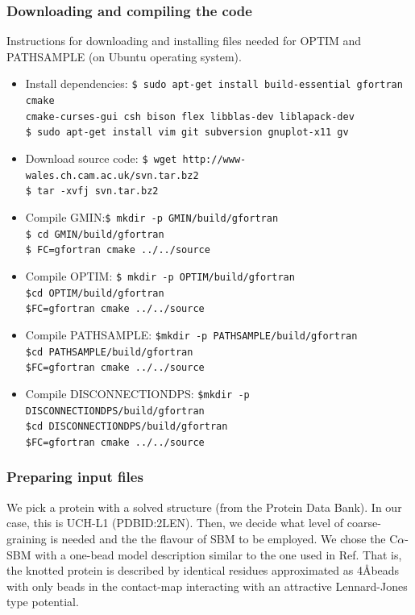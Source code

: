 \documentclass[journal=jacsat]{achemso}
\begin{document}
\subsubsection{Downloading and compiling the code}
Instructions for downloading and installing files needed for OPTIM and PATHSAMPLE (on Ubuntu operating system).
\begin{itemize}
\setlength\itemsep{0.01em}
    \small
    \item{Install dependencies: \tt{\$ sudo apt-get install build-essential gfortran cmake \\ cmake-curses-gui csh bison flex libblas-dev liblapack-dev\\ \$ sudo apt-get install vim git subversion gnuplot-x11 gv}}
    \item {Download source code: \tt{\$ wget http://www-wales.ch.cam.ac.uk/svn.tar.bz2 \\ \$ tar -xvfj svn.tar.bz2}}
    \item{Compile GMIN:\tt{\$ mkdir -p GMIN/build/gfortran \\ \$ cd GMIN/build/gfortran\\ \$ FC=gfortran cmake ../../source}}
    \item{Compile OPTIM: \tt{\$ mkdir -p OPTIM/build/gfortran} \\ \$cd OPTIM/build/gfortran \\ \$FC=gfortran cmake ../../source}
    \item{Compile PATHSAMPLE: \tt{\$mkdir -p PATHSAMPLE/build/gfortran} \\ \$cd PATHSAMPLE/build/gfortran \\ \$FC=gfortran cmake ../../source}
    \item{Compile DISCONNECTIONDPS: \tt{\$mkdir -p DISCONNECTIONDPS/build/gfortran} \\ \$cd DISCONNECTIONDPS/build/gfortran \\ \$FC=gfortran cmake ../../source}
\end{itemize}
\subsubsection{Preparing input files}
We pick a protein with a solved structure (from the Protein Data Bank\cite{PDB}). In our case, this is UCH-L1 (PDBID:2LEN)\cite{}. Then, we decide what level of coarse-graining is needed and the the flavour of SBM to be employed. We chose the C$\alpha$-SBM with a one-bead model description similar to the one used in Ref\cite{Zhao18a}. That is, the knotted protein is described by identical residues approximated as 4\AA beads with only beads in the contact-map interacting with an attractive Lennard-Jones type potential\cite{smog}. 
\end{document}
